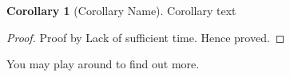 \documentclass[11.5pt, paper=a4]{article}
\theoremstyle{definition}
\newtheorem{corollary}[theorem]{Corollary}
\numberwithin{theorem}{section}
\begin{document}
    \begin{corollary}[Corollary Name]
    \label{cor:less_inappropriate_text}
        Corollary text
    \end{corollary}
    
    \begin{proof}
        Proof by Lack of sufficient time. Hence proved.
\end{proof}

You may play around to find out more.



\end{document}
